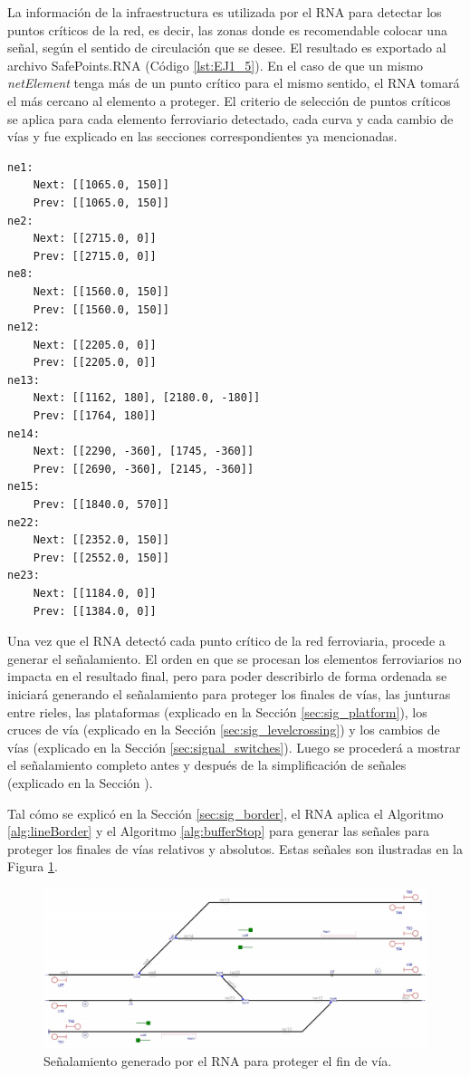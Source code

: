 	La información de la infraestructura es utilizada por el RNA para detectar los puntos críticos de la red, es decir, las zonas donde es recomendable colocar una señal, según el sentido de circulación que se desee. El resultado es exportado al archivo SafePoints.RNA (Código \ref{lst:EJ1_5}). En el caso de que un mismo \textit{netElement} tenga más de un punto crítico para el mismo sentido, el RNA tomará el más cercano al elemento a proteger. El criterio de selección de puntos críticos se aplica para cada elemento ferroviario detectado, cada curva y cada cambio de vías y fue explicado en las secciones correspondientes ya mencionadas.
	
	\begin{lstlisting}[language = {}, caption = SafePoints.RNA, label = {lst:EJ1_5}]
ne1:
	Next: [[1065.0, 150]]
	Prev: [[1065.0, 150]]
ne2:
	Next: [[2715.0, 0]]
	Prev: [[2715.0, 0]]
ne8:
	Next: [[1560.0, 150]]
	Prev: [[1560.0, 150]]
ne12:
	Next: [[2205.0, 0]]
	Prev: [[2205.0, 0]]
ne13:
	Next: [[1162, 180], [2180.0, -180]]
	Prev: [[1764, 180]]
ne14:
	Next: [[2290, -360], [1745, -360]]
	Prev: [[2690, -360], [2145, -360]]
ne15:
	Prev: [[1840.0, 570]]
ne22:
	Next: [[2352.0, 150]]
	Prev: [[2552.0, 150]]
ne23:
	Next: [[1184.0, 0]]
	Prev: [[1384.0, 0]]
	\end{lstlisting}
	
	Una vez que el RNA detectó cada punto crítico de la red ferroviaria, procede a generar el señalamiento. El orden en que se procesan los elementos ferroviarios no impacta en el resultado final, pero para poder describirlo de forma ordenada se iniciará generando el señalamiento para proteger los finales de vías, las junturas entre rieles, las plataformas (explicado en la Sección \ref{sec:sig_platform}), los cruces de vía (explicado en la Sección \ref{sec:sig_levelcrossing}) y los cambios de vías (explicado en la Sección \ref{sec:signal_switches}). Luego se procederá a mostrar el señalamiento completo antes y después de la simplificación de señales (explicado en la Sección \label{sec:simplificacion}). 
	
	
	Tal cómo se explicó en la Sección \ref{sec:sig_border}, el RNA aplica el Algoritmo \ref{alg:lineBorder} y el Algoritmo \ref{alg:bufferStop} para generar las señales para proteger los finales de vías relativos y absolutos. Estas señales son ilustradas en la Figura \ref{fig:EJ1_3}.
	
	\begin{figure}[H]
		\centering
		\includegraphics[width=1\textwidth]{resultados-obtenidos/ejemplo1/images/1_step1.png}
		\centering\caption{Señalamiento generado por el RNA para proteger el fin de vía.}
		\label{fig:EJ1_3}
	\end{figure}
	
